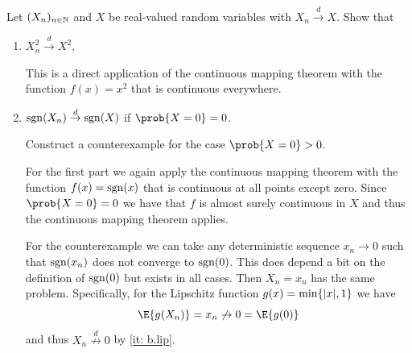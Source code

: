 \begin{exercise}
    Let \((X_n)_{n\in \mathbb{N}}\) and \(X\) be real-valued random variables
    with \(X_n \overset{d}\to X\). Show that
    \begin{enumerate}[label=(\alph*), noitemsep]
        \item \(X_n^2 \overset{d}\to X^2\),
        \begin{solution}
            This is a direct application of the continuous mapping theorem with the function \(f(x) = x^2\) that is continuous everywhere.            
        \end{solution}

        \item \(\operatorname{sgn}(X_n) \overset{d}\to \operatorname{sgn}(X)\) if \(\prob{X=0} = 0\).

        Construct a counterexample for the case \(\prob{X=0} > 0\).
        \begin{solution}
            For the first part we again apply the continuous mapping theorem with the function \(f(x) = \operatorname{sgn}(x)\) that is continuous at all points except zero. Since \(\prob{X=0} = 0\) we have that \(f\) is almost surely continuous in \(X\) and thus the continuous mapping theorem applies.

            For the counterexample we can take any deterministic sequence \(x_n\to 0\)
            such that \(\operatorname{sgn}(x_n)\) does not converge to \(\operatorname{sgn}(0)\). This does depend a bit on the definition
            of \(\operatorname{sgn}(0)\) but exists in all cases. Then \(X_n = x_n\) has the same problem.
            Specifically, for the Lipschitz function \(g(x) = \min\{\lvert x\rvert,
            1\}\) we have
            \[
                \E{g(X_n)} = x_n \not\to 0 = \E{g(0)}
            \]
            and thus \(X_n \overset{d}{\not\to} 0\) by \ref{it: b.lip}.
        \end{solution}
    \end{enumerate}
\end{exercise}

